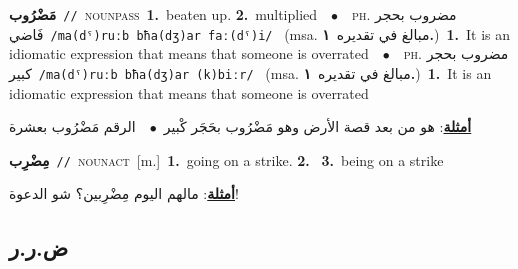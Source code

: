 \documentclass[10pt,a4paper,twoside]{article} %
\begin{document}
\begin{multicols}{2}
{\setlength\topsep{0pt}\textbf{\foreignlanguage{arabic}{مَضْرُوب}}\ {\color{gray}\texttt{//}\color{black}}\ \textsc{noun\textunderscore pass}\ \textbf{1.}~beaten up.  \textbf{2.}~multiplied\ \ $\bullet$\ \ \textsc{ph.} \color{gray} \foreignlanguage{arabic}{مضروب بحجر فَاضي}\color{black}\ {\color{gray}\texttt{/{\sffamily ma(dˤ)ruːb bħa(dʒ)ar faː(dˤ)i}/}\color{black}}\ \color{gray} (msa. \foreignlanguage{arabic}{مبالغ في تقديره}~\foreignlanguage{arabic}{\textbf{١.}})\color{black}\ \textbf{1.}~It is an idiomatic expression that means that someone is overrated\ \ $\bullet$\ \ \textsc{ph.} \color{gray} \foreignlanguage{arabic}{مضروب بحجر كبير}\color{black}\ {\color{gray}\texttt{/{\sffamily ma(dˤ)ruːb bħa(dʒ)ar (k)biːr}/}\color{black}}\ \color{gray} (msa. \foreignlanguage{arabic}{مبالغ في تقديره}~\foreignlanguage{arabic}{\textbf{١.}})\color{black}\ \textbf{1.}~It is an idiomatic expression that means that someone is overrated\  \begin{flushright}\color{gray}\foreignlanguage{arabic}{\textbf{\underline{\foreignlanguage{arabic}{أمثلة}}}: هو من بعد قصة الأرض وهو مَضْرُوب بحَجَر كْبير\ $\bullet$\ \  الرقم مَضْرُوب بعشرة}\end{flushright}\color{black}} \vspace{2mm}

{\setlength\topsep{0pt}\textbf{\foreignlanguage{arabic}{مِضْرِب}}\ {\color{gray}\texttt{//}\color{black}}\ \textsc{noun\textunderscore act}\ [m.]\ \textbf{1.}~going on a strike.  \textbf{2.}~  \textbf{3.}~being on a strike\  \begin{flushright}\color{gray}\foreignlanguage{arabic}{\textbf{\underline{\foreignlanguage{arabic}{أمثلة}}}: مالهم اليوم مِضْرِبين؟ شو الدعوة!}\end{flushright}\color{black}} \vspace{2mm}

\vspace{-3mm}
\subsection*{\color{blue}\foreignlanguage{arabic}{ض.ر.ر}\color{blue}{}} 


\end{multicols}
\end{document}
